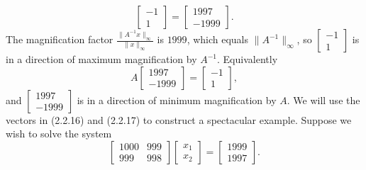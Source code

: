 \documentclass{report}
\begin{document}
\begin{mdframed}
\[            \begin{bmatrix}
                -1 \\
                1
            \end{bmatrix}
            =
            \begin{bmatrix}
                1997 \\
                -1999
            \end{bmatrix}.
        \]
        The magnification factor 
        \(
        \frac{\|A^{-1}x\|_{\infty}}{\|x\|_{\infty}}
        \)
        is $1999$, which equals $\|A^{-1}\|_{\infty}$, so 
        \(
        \begin{bmatrix}
            -1 \\ 1
        \end{bmatrix}
        \)
        is in a direction of maximum magnification by $A^{-1}$. Equivalently
        \[
            A 
            \begin{bmatrix}
                1997 \\
                -1999
            \end{bmatrix}
            =
            \begin{bmatrix}
                -1 \\
                1
            \end{bmatrix},
            \tag{2.2.17}
        \]
        and 
        \(
        \begin{bmatrix}
            1997 \\ -1999
        \end{bmatrix}
        \)
        is in a direction of minimum magnification by $A$.
        \bigbreak \noindent 
        We will use the vectors in (2.2.16) and (2.2.17) to construct a spectacular example.  Suppose we wish to solve the system
        \[
            \begin{bmatrix}
                1000 & 999 \\
                999  & 998
            \end{bmatrix}
            \begin{bmatrix}
                x_{1} \\
                x_{2}
            \end{bmatrix}
            =
            \begin{bmatrix}
                1999 \\
                1997
            \end{bmatrix}.
            \tag{2.2.18}
        \]

\end{mdframed}
\end{document}
